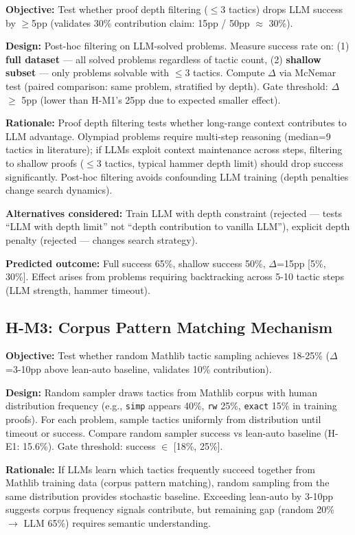 \textbf{Objective:} Test whether proof depth filtering ($\leq$3 tactics) drops LLM success by $\geq$5pp (validates 30\% contribution claim: 15pp / 50pp $\approx$ 30\%).

\textbf{Design:} Post-hoc filtering on LLM-solved problems. Measure success rate on: (1) \textbf{full dataset} --- all solved problems regardless of tactic count, (2) \textbf{shallow subset} --- only problems solvable with $\leq$3 tactics. Compute $\Delta$ via McNemar test (paired comparison: same problem, stratified by depth). Gate threshold: $\Delta$ $\geq$ 5pp (lower than H-M1's 25pp due to expected smaller effect).

\textbf{Rationale:} Proof depth filtering tests whether long-range context contributes to LLM advantage. Olympiad problems require multi-step reasoning (median=9 tactics in literature); if LLMs exploit context maintenance across steps, filtering to shallow proofs ($\leq$3 tactics, typical hammer depth limit) should drop success significantly. Post-hoc filtering avoids confounding LLM training (depth penalties change search dynamics).

\textbf{Alternatives considered:} Train LLM with depth constraint (rejected --- tests ``LLM with depth limit'' not ``depth contribution to vanilla LLM''), explicit depth penalty (rejected --- changes search strategy).

\textbf{Predicted outcome:} Full success 65\%, shallow success 50\%, $\Delta$=15pp [5\%, 30\%]. Effect arises from problems requiring backtracking across 5-10 tactic steps (LLM strength, hammer timeout).

\subsection{H-M3: Corpus Pattern Matching Mechanism}

\textbf{Objective:} Test whether random Mathlib tactic sampling achieves 18-25\% ($\Delta$=3-10pp above lean-auto baseline, validates 10\% contribution).

\textbf{Design:} Random sampler draws tactics from Mathlib corpus with human distribution frequency (e.g., \texttt{simp} appears 40\%, \texttt{rw} 25\%, \texttt{exact} 15\% in training proofs). For each problem, sample tactics uniformly from distribution until timeout or success. Compare random sampler success vs lean-auto baseline (H-E1: 15.6\%). Gate threshold: success $\in$ [18\%, 25\%].

\textbf{Rationale:} If LLMs learn which tactics frequently succeed together from Mathlib training data (corpus pattern matching), random sampling from the same distribution provides stochastic baseline. Exceeding lean-auto by 3-10pp suggests corpus frequency signals contribute, but remaining gap (random 20\% $\rightarrow$ LLM 65\%) requires semantic understanding.

